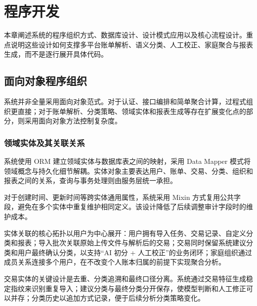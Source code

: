 \chapter{程序开发}

本章阐述系统的程序组织方式、数据库设计、设计模式应用以及核心流程设计。重点说明这些设计如何支撑多平台账单解析、语义分类、人工校正、家庭聚合与报表生成，而不是逐行展开具体代码。

\section{面向对象程序组织}

系统并非全量采用面向对象范式。对于认证、接口编排和简单聚合计算，过程式组织更直接；对于账单解析、分类策略、领域实体和报表生成等存在扩展变化点的部分，则采用面向对象方法控制复杂度。

\subsection{领域实体及其关联关系}

系统使用 ORM 建立领域实体与数据库表之间的映射，采用 Data Mapper 模式将领域概念与持久化细节解耦。实体对象主要表达用户、账单、交易、分类、组织和报表之间的关系，查询与事务处理则由服务层统一承担。

对于创建时间、更新时间等跨实体通用属性，系统采用 Mixin 方式复用公共字段，避免在多个实体中重复维护相同定义。该设计降低了后续调整审计字段时的维护成本。

实体关联的核心拓扑以用户为中心展开：用户拥有导入任务、交易记录、自定义分类和报表；导入批次关联原始上传文件与解析后的交易；交易同时保留系统建议分类和用户最终确认分类，以支持“AI 初分 + 人工校正”的业务闭环；家庭组织通过成员关系连接多个用户，在不改变个人账本归属的前提下实现聚合分析。

交易实体的关键设计是去重、分类追溯和最终口径分离。系统通过交易特征生成稳定指纹来识别重复导入；建议分类与最终分类分开保存，使模型判断和人工修正可以并存；分类历史以追加方式记录，便于后续分析分类策略变化。

